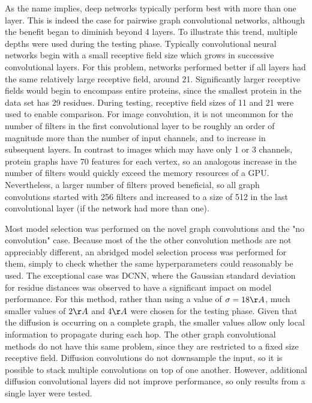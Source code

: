 As the name implies, deep networks typically perform best with more than one layer. 
This is indeed the case for pairwise graph convolutional networks, although the benefit began to diminish beyond 4 layers.
To illustrate this trend, multiple depths were used during the testing phase.
Typically convolutional neural networks begin with a small receptive field size which grows in successive convolutional layers.
For this problem, networks performed better if all layers had the same relatively large receptive field, around 21. 
Significantly larger receptive fields would begin to encompass entire proteins, since the smallest protein in the data set has 29 residues.
During testing, receptive field sizes of 11 and 21 were used to enable comparison.
For image convolution, it is not uncommon for the number of filters in the first convolutional layer to be roughly an order of magnitude more than the number of input channels, and to increase in subsequent layers.
In contrast to images which may have only 1 or 3 channels, protein graphs have 70 features for each vertex, so an analogous increase in the number of filters would quickly exceed the memory resources of a GPU.
Nevertheless, a larger number of filters proved beneficial, so all graph convolutions started with 256 filters and increased to a size of 512 in the last convolutional layer (if the network had more than one).


Most model selection was performed on the novel graph convolutions and the "no convolution" case.
Because most of the the other convolution methods are not appreciably different, an abridged model selection process was performed for them, simply to check whether the same hyperparameters could reasonably be used.
The exceptional case was DCNN, where the Gaussian standard deviation for residue distances was observed to have a significant impact on model performance. 
For this method, rather than using a value of $\sigma = 18\AA{}$, much smaller values of $2\AA{}$ and $4\AA{}$ were chosen for the testing phase.
Given that the diffusion is occurring on a complete graph, the smaller values allow only local information to propagate during each hop.
The other graph convolutional methods do not have this same problem, since they are restricted to a fixed size receptive field. 
Diffusion convolutions do not downsample the input, so it is possible to stack multiple convolutions on top of one another.
However, additional diffusion convolutional layers did not improve performance, so only results from a single layer were tested.

